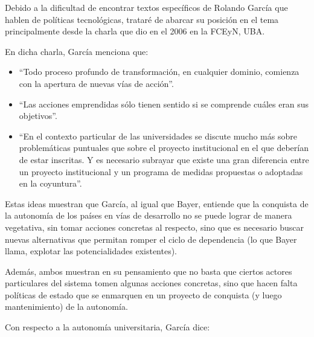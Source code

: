 Debido a la dificultad de encontrar textos específicos de Rolando García que hablen de políticas tecnológicas, trataré de abarcar su posición en el tema principalmente desde la charla que dio en el 2006 en la FCEyN, UBA.

En dicha charla, García menciona que:

\begin{itemize}
    \item ``Todo proceso profundo de transformación, en cualquier dominio, comienza con la apertura de nuevas vías de acción''.
    \item ``Las acciones emprendidas sólo tienen sentido si se comprende cuáles eran sus objetivos''.
    \item ``En el contexto particular de las universidades se discute mucho más sobre problemáticas puntuales que sobre el proyecto institucional en el que deberían de estar inscritas. Y es necesario subrayar que existe una gran diferencia entre un proyecto institucional y un programa de medidas propuestas o adoptadas en la coyuntura''.
\end{itemize}

Estas ideas muestran que García, al igual que Bayer, entiende que la conquista de la autonomía de los países en vías de desarrollo no se puede lograr de manera vegetativa, sin tomar acciones concretas al respecto, sino que es necesario buscar nuevas alternativas que permitan romper el ciclo de dependencia (lo que Bayer llama, explotar las potencialidades existentes).

Además, ambos muestran en su pensamiento que no basta que ciertos actores particulares del sistema tomen algunas acciones concretas, sino que hacen falta políticas de estado que se enmarquen en un proyecto de conquista (y luego mantenimiento) de la autonomía.

Con respecto a la autonomía universitaria, García dice:

